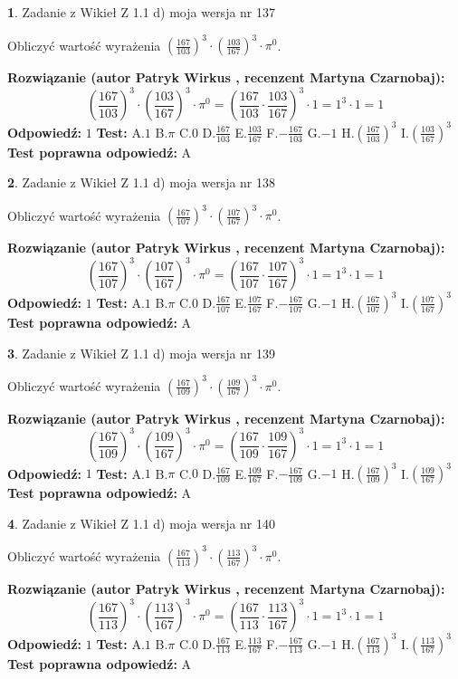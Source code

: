 \documentclass[12pt, a4paper]{article}
\theoremstyle{definition} %
\newtheorem{zad}{}
\newcommand{\zadStart}[1]{\begin{zad}#1\newline}
\newcommand{\zadStop}{\end{zad}}
\newcommand{\rozwStart}[2]{\noindent \textbf{Rozwiązanie (autor #1 , recenzent #2): }\newline}
\newcommand{\rozwStop}{\newline}
\newcommand{\odpStart}{\noindent \textbf{Odpowiedź:}\newline}
\newcommand{\odpStop}{\newline}
\newcommand{\testStart}{\noindent \textbf{Test:}\newline}
\newcommand{\testStop}{\newline}
\newcommand{\kluczStart}{\noindent \textbf{Test poprawna odpowiedź:}\newline}
\newcommand{\kluczStop}{\newline}
\begin{document}
\zadStart{Zadanie z Wikieł Z 1.1 d) moja wersja nr 137}

Obliczyć wartość wyrażenia $(\frac{167}{103})^{3} \cdot (\frac{103}{167})^{3} \cdot \pi^{0}$.
\zadStop
\rozwStart{Patryk Wirkus}{Martyna Czarnobaj}
$$(\frac{167}{103})^{3} \cdot (\frac{103}{167})^{3} \cdot \pi^{0} = (\frac{167}{103} \cdot \frac{103}{167})^{3} \cdot 1 = 1^{3} \cdot 1 = 1$$
\rozwStop
\odpStart
$1$
\odpStop
\testStart
A.$1$ B.$\pi$ C.$0$ D.$\frac{167}{103}$ E.$\frac{103}{167}$
F.$-\frac{167}{103}$ G.$-1$
H.$(\frac{167}{103})^{3}$
I.$(\frac{103}{167})^{3}$
\testStop
\kluczStart
A
\kluczStop



\zadStart{Zadanie z Wikieł Z 1.1 d) moja wersja nr 138}

Obliczyć wartość wyrażenia $(\frac{167}{107})^{3} \cdot (\frac{107}{167})^{3} \cdot \pi^{0}$.
\zadStop
\rozwStart{Patryk Wirkus}{Martyna Czarnobaj}
$$(\frac{167}{107})^{3} \cdot (\frac{107}{167})^{3} \cdot \pi^{0} = (\frac{167}{107} \cdot \frac{107}{167})^{3} \cdot 1 = 1^{3} \cdot 1 = 1$$
\rozwStop
\odpStart
$1$
\odpStop
\testStart
A.$1$ B.$\pi$ C.$0$ D.$\frac{167}{107}$ E.$\frac{107}{167}$
F.$-\frac{167}{107}$ G.$-1$
H.$(\frac{167}{107})^{3}$
I.$(\frac{107}{167})^{3}$
\testStop
\kluczStart
A
\kluczStop



\zadStart{Zadanie z Wikieł Z 1.1 d) moja wersja nr 139}

Obliczyć wartość wyrażenia $(\frac{167}{109})^{3} \cdot (\frac{109}{167})^{3} \cdot \pi^{0}$.
\zadStop
\rozwStart{Patryk Wirkus}{Martyna Czarnobaj}
$$(\frac{167}{109})^{3} \cdot (\frac{109}{167})^{3} \cdot \pi^{0} = (\frac{167}{109} \cdot \frac{109}{167})^{3} \cdot 1 = 1^{3} \cdot 1 = 1$$
\rozwStop
\odpStart
$1$
\odpStop
\testStart
A.$1$ B.$\pi$ C.$0$ D.$\frac{167}{109}$ E.$\frac{109}{167}$
F.$-\frac{167}{109}$ G.$-1$
H.$(\frac{167}{109})^{3}$
I.$(\frac{109}{167})^{3}$
\testStop
\kluczStart
A
\kluczStop



\zadStart{Zadanie z Wikieł Z 1.1 d) moja wersja nr 140}

Obliczyć wartość wyrażenia $(\frac{167}{113})^{3} \cdot (\frac{113}{167})^{3} \cdot \pi^{0}$.
\zadStop
\rozwStart{Patryk Wirkus}{Martyna Czarnobaj}
$$(\frac{167}{113})^{3} \cdot (\frac{113}{167})^{3} \cdot \pi^{0} = (\frac{167}{113} \cdot \frac{113}{167})^{3} \cdot 1 = 1^{3} \cdot 1 = 1$$
\rozwStop
\odpStart
$1$
\odpStop
\testStart
A.$1$ B.$\pi$ C.$0$ D.$\frac{167}{113}$ E.$\frac{113}{167}$
F.$-\frac{167}{113}$ G.$-1$
H.$(\frac{167}{113})^{3}$
I.$(\frac{113}{167})^{3}$
\testStop
\kluczStart
A
\kluczStop
\end{document}
